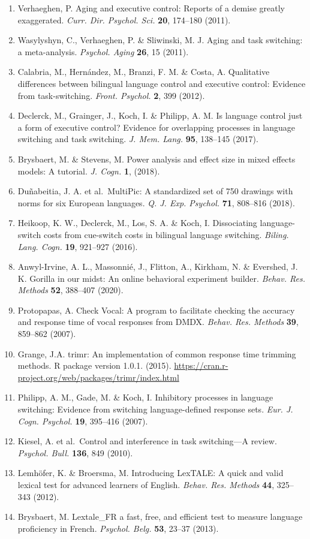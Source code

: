 \documentclass[
]{article}
\begin{document}
\begin{enumerate}
\item
  Verhaeghen, P. Aging and executive control: Reports of a demise greatly exaggerated. \emph{Curr. Dir. Psychol. Sci.} \textbf{20}, 174--180 (2011).
\item
  Wasylyshyn, C., Verhaeghen, P. \& Sliwinski, M. J. Aging and task switching: a meta-analysis. \emph{Psychol. Aging} \textbf{26}, 15 (2011).
\item
  Calabria, M., Hernández, M., Branzi, F. M. \& Costa, A. Qualitative differences between bilingual language control and executive control: Evidence from task-switching. \emph{Front. Psychol.} \textbf{2}, 399 (2012).
\item
  Declerck, M., Grainger, J., Koch, I. \& Philipp, A. M. Is language control just a form of executive control? Evidence for overlapping processes in language switching and task switching. \emph{J. Mem. Lang.} \textbf{95}, 138--145 (2017).
\item
  Brysbaert, M. \& Stevens, M. Power analysis and effect size in mixed effects models: A tutorial. \emph{J. Cogn.} \textbf{1}, (2018).
\item
  Duñabeitia, J. A. et al.~MultiPic: A standardized set of 750 drawings with norms for six European languages. \emph{Q. J. Exp. Psychol.} \textbf{71}, 808--816 (2018).
\item
  Heikoop, K. W., Declerck, M., Los, S. A. \& Koch, I. Dissociating language-switch costs from cue-switch costs in bilingual language switching. \emph{Biling. Lang. Cogn.} \textbf{19}, 921--927 (2016).
\item
  Anwyl-Irvine, A. L., Massonnié, J., Flitton, A., Kirkham, N. \& Evershed, J. K. Gorilla in our midst: An online behavioral experiment builder. \emph{Behav. Res. Methods} \textbf{52}, 388--407 (2020).
\item
  Protopapas, A. Check Vocal: A program to facilitate checking the accuracy and response time of vocal responses from DMDX. \emph{Behav. Res. Methods} \textbf{39}, 859--862 (2007).
\item
  Grange, J.A. trimr: An implementation of common response time trimming methods. R package version 1.0.1. (2015). \url{https://cran.r-project.org/web/packages/trimr/index.html}
\item
  Philipp, A. M., Gade, M. \& Koch, I. Inhibitory processes in language switching: Evidence from switching language-defined response sets. \emph{Eur. J. Cogn. Psychol.} \textbf{19}, 395--416 (2007).
\item
  Kiesel, A. et al.~Control and interference in task switching---A review. \emph{Psychol. Bull.} \textbf{136}, 849 (2010).
\item
  Lemhöfer, K. \& Broersma, M. Introducing LexTALE: A quick and valid lexical test for advanced learners of English. \emph{Behav. Res. Methods} \textbf{44}, 325--343 (2012).
\item
  Brysbaert, M. Lextale\_FR a fast, free, and efficient test to measure language proficiency in French. \emph{Psychol. Belg.} \textbf{53}, 23--37 (2013).
\end{enumerate}
\end{document}
